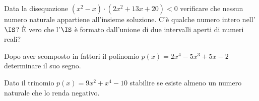 % 
% 
% 




\begin{esercizio}
\label{ese:4.32}
Data la disequazione 
\(\left(x^2-x\right) \cdot \left(2x^2+13x+20\right)<0\) 
verificare che nessun numero naturale appartiene all'insieme soluzione. 
C'è qualche numero intero nell'\( \IS \)? È vero che l'\( \IS \) è 
formato dall'unione di due intervalli aperti di numeri reali?
\end{esercizio}

\begin{esercizio}
\label{ese:4.33}
Dopo aver scomposto in fattori il polinomio \(p(x)=2x^4-5x^3+5x-2\) 
determinare il 
suo segno.
\end{esercizio}

\begin{esercizio}
\label{ese:4.34}
Dato il trinomio \(p(x)=9x^2+x^4-10\) stabilire se esiste almeno un numero 
naturale che lo renda negativo.
\end{esercizio}

